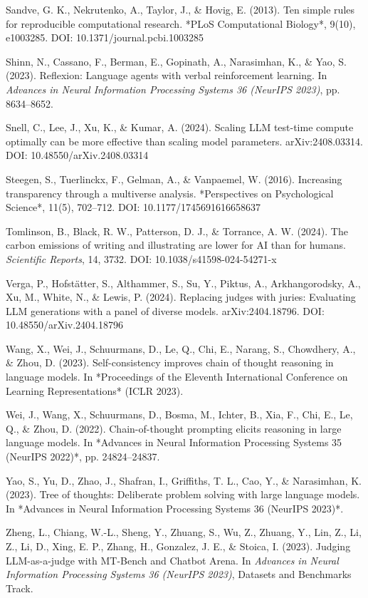 \documentclass[11pt,a4paper]{article}
\begin{document}
Sandve, G. K., Nekrutenko, A., Taylor, J., \& Hovig, E. (2013). Ten simple
rules for reproducible computational research. *PLoS Computational
Biology*, 9(10), e1003285. DOI: 10.1371/journal.pcbi.1003285

Shinn, N., Cassano, F., Berman, E., Gopinath, A., Narasimhan, K., \& Yao, S.
(2023). Reflexion: Language agents with verbal reinforcement learning.
In \textit{Advances in Neural Information Processing Systems 36 (NeurIPS 2023)},
pp. 8634–8652.

Snell, C., Lee, J., Xu, K., \& Kumar, A. (2024). Scaling LLM test-time
compute optimally can be more effective than scaling model parameters.
arXiv:2408.03314. DOI: 10.48550/arXiv.2408.03314

Steegen, S., Tuerlinckx, F., Gelman, A., \& Vanpaemel, W. (2016). Increasing
transparency through a multiverse analysis. *Perspectives on Psychological
Science*, 11(5), 702–712. DOI: 10.1177/1745691616658637

Tomlinson, B., Black, R. W., Patterson, D. J., \& Torrance, A. W. (2024).
The carbon emissions of writing and illustrating are lower for AI than for
humans. \textit{Scientific Reports}, 14, 3732.
DOI: 10.1038/s41598-024-54271-x

Verga, P., Hofstätter, S., Althammer, S., Su, Y., Piktus, A.,
Arkhangorodsky, A., Xu, M., White, N., \& Lewis, P. (2024). Replacing judges
with juries: Evaluating LLM generations with a panel of diverse models.
arXiv:2404.18796. DOI: 10.48550/arXiv.2404.18796

Wang, X., Wei, J., Schuurmans, D., Le, Q., Chi, E., Narang, S.,
Chowdhery, A., \& Zhou, D. (2023). Self-consistency improves chain of thought
reasoning in language models. In *Proceedings of the Eleventh International
Conference on Learning Representations* (ICLR 2023).

Wei, J., Wang, X., Schuurmans, D., Bosma, M., Ichter, B., Xia, F., Chi, E.,
Le, Q., \& Zhou, D. (2022). Chain-of-thought prompting elicits reasoning in
large language models. In *Advances in Neural Information Processing Systems
35 (NeurIPS 2022)*, pp. 24824–24837.

Yao, S., Yu, D., Zhao, J., Shafran, I., Griffiths, T. L., Cao, Y., \&
Narasimhan, K. (2023). Tree of thoughts: Deliberate problem solving with
large language models. In *Advances in Neural Information Processing Systems
36 (NeurIPS 2023)*.

Zheng, L., Chiang, W.-L., Sheng, Y., Zhuang, S., Wu, Z., Zhuang, Y.,
Lin, Z., Li, Z., Li, D., Xing, E. P., Zhang, H., Gonzalez, J. E., \&
Stoica, I. (2023). Judging LLM-as-a-judge with MT-Bench and Chatbot Arena.
In \textit{Advances in Neural Information Processing Systems 36 (NeurIPS 2023)},
Datasets and Benchmarks Track.
\end{document}
